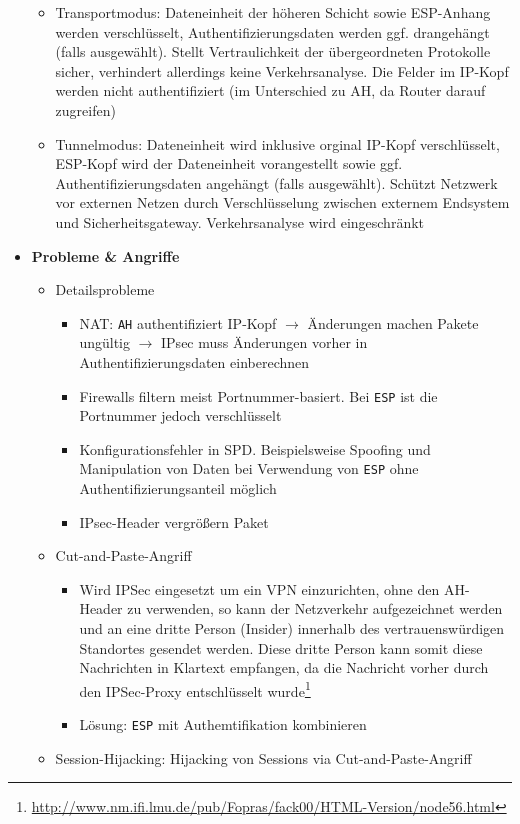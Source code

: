 \begin{itemize}
\begin{itemize}
		\item Transportmodus: Dateneinheit der höheren Schicht sowie ESP-Anhang werden verschlüsselt, Authentifizierungsdaten werden ggf. drangehängt (falls ausgewählt). Stellt Vertraulichkeit der übergeordneten Protokolle sicher, verhindert allerdings keine Verkehrsanalyse. Die Felder im IP-Kopf werden nicht authentifiziert (im Unterschied zu AH, da Router darauf zugreifen)
		\item Tunnelmodus: Dateneinheit wird inklusive orginal IP-Kopf verschlüsselt, ESP-Kopf wird der Dateneinheit vorangestellt sowie ggf. Authentifizierungsdaten angehängt (falls ausgewählt). Schützt Netzwerk vor externen Netzen durch Verschlüsselung zwischen externem Endsystem und Sicherheitsgateway. Verkehrsanalyse wird eingeschränkt
	\end{itemize}
	\item \textbf{Probleme \& Angriffe}
	\begin{itemize}
		\item Detailsprobleme
		\begin{itemize}
			\item NAT: \texttt{AH} authentifiziert IP-Kopf \(\rightarrow\) Änderungen machen Pakete ungültig \(\rightarrow\) IPsec muss Änderungen vorher in Authentifizierungsdaten einberechnen
			\item Firewalls filtern meist Portnummer-basiert. Bei \texttt{ESP} ist die Portnummer jedoch verschlüsselt
			\item Konfigurationsfehler in SPD. Beispielsweise Spoofing und Manipulation von Daten bei Verwendung von \texttt{ESP} ohne Authentifizierungsanteil möglich
			\item IPsec-Header vergrößern Paket
		\end{itemize}
		\item Cut-and-Paste-Angriff
		\begin{itemize}
			\item Wird IPSec eingesetzt um ein VPN einzurichten, ohne den AH-Header zu verwenden, so kann der Netzverkehr aufgezeichnet werden und an eine dritte Person (Insider) innerhalb des vertrauenswürdigen Standortes gesendet werden. Diese dritte Person kann somit diese Nachrichten in Klartext empfangen, da die Nachricht vorher durch den IPSec-Proxy entschlüsselt wurde\footnote{\url{http://www.nm.ifi.lmu.de/pub/Fopras/fack00/HTML-Version/node56.html}}
			\item Lösung: \texttt{ESP} mit Authemtifikation kombinieren
		\end{itemize}
		\item Session-Hijacking: Hijacking von Sessions via Cut-and-Paste-Angriff
	\end{itemize}
\end{itemize}


